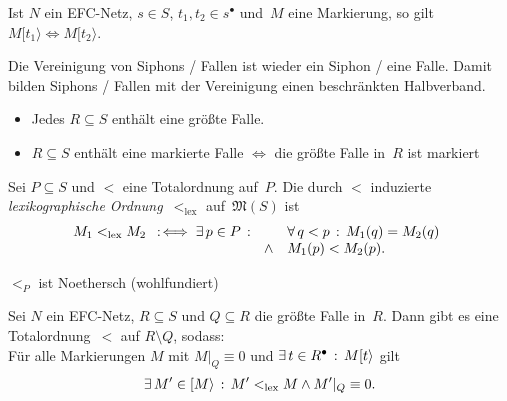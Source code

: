 \documentclass{cheat-sheet}
\newcommand{\postset}[1]{{#1}^\bullet} %
\newcommand{\activeTransition}[1]{[{#1}\rangle} %
\newcommand{\Markings}{\mathfrak{M}} %
\begin{document}
\begin{bem}
  Ist $N$ ein EFC-Netz, $s \in S$, $t_1, t_2 \in \postset{s}$ und~$M$ eine Markierung, so gilt $M \activeTransition{t_1} \iff M \activeTransition{t_2}$.
\end{bem}


\begin{lem}
  Die Vereinigung von Siphons / Fallen ist wieder ein Siphon / eine Falle.
  Damit bilden Siphons / Fallen mit der Vereinigung einen beschränkten Halbverband.
\end{lem}

\begin{kor}
  \begin{itemize}
    \item Jedes $R \subseteq S$ enthält eine größte Falle.
    \item $R \subseteq S$ enthält eine markierte Falle $\iff$ die größte Falle in~$R$ ist markiert
  \end{itemize}
\end{kor}

\begin{defn}
  Sei $P \subseteq S$ und ${<}$ eine Totalordnung auf~$P$.
  Die durch ${<}$ induzierte \emph{lexikographische Ordnung}~${<_\mathrm{lex}}$ auf~$\Markings(S)$ ist
  \[
    M_1 <_\mathrm{lex} M_2 \enspace:\!\iff \exists \, {p \in P} \,:\,
    \begin{array}[t]{r l}
      & \forall \, {q < p} \,:\, M_1(q) = M_2(q) \\
      \wedge & M_1(p) < M_2(p).
    \end{array}
  \]
\end{defn}

\begin{lem}
  $<_P$ ist Noethersch (wohlfundiert)
\end{lem}

\begin{lem}
  Sei $N$ ein EFC-Netz, $R \subseteq S$ und $Q \subseteq R$ die größte Falle in~$R$.
  Dann gibt es eine Totalordnung~${<}$ auf $R \setminus Q$, sodass: \\[0.2em]
  Für alle Markierungen $M$ mit $M|_Q \equiv 0$ und $\ex{t \in \postset{R}} M \activeTransition{t}$ gilt
  \[
    \ex{M' \in \activeTransition{M}} M' <_\mathrm{lex} M \wedge M'|_Q \equiv 0.
  \]
\end{lem}
\end{document}
